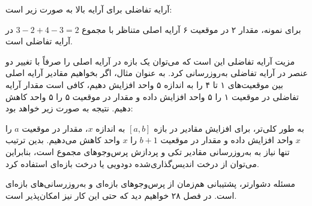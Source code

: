 آرایه تفاضلی برای آرایه بالا به صورت زیر است:
\begin{center}
\end{center}

برای نمونه، مقدار ۲ در موقعیت ۶ آرایه اصلی متناظر با مجموع $3-2+4-3=2$ در آرایه تفاضلی است.

مزیت آرایه تفاضلی این است که می‌توان یک بازه در آرایه اصلی را صرفاً با تغییر دو عنصر در آرایه تفاضلی به‌روزرسانی کرد. به عنوان مثال، اگر بخواهیم مقادیر آرایه اصلی بین موقعیت‌های ۱ تا ۴ را به اندازه ۵ واحد افزایش دهیم، کافی است مقدار آرایه تفاضلی در موقعیت ۱ را ۵ واحد افزایش داده و مقدار در موقعیت ۵ را ۵ واحد کاهش دهیم. نتیجه به صورت زیر خواهد بود:

\begin{center}
\end{center}

به طور کلی‌تر، برای افزایش مقادیر در بازه $[a,b]$ به اندازه $x$، مقدار در موقعیت $a$ را $x$ واحد افزایش داده و مقدار در موقعیت $b+1$ را $x$ واحد کاهش می‌دهیم. بدین ترتیب تنها نیاز به به‌روزرسانی مقادیر تکی و پردازش پرس‌وجوهای مجموع است، بنابراین می‌توان از درخت اندیس‌گذاری‌شده دودویی یا درخت بازه‌ای استفاده کرد.

مسئله دشوارتر، پشتیبانی هم‌زمان از پرس‌وجوهای بازه‌ای و به‌روزرسانی‌های بازه‌ای است. در فصل ۲۸ خواهیم دید که حتی این کار نیز امکان‌پذیر است.